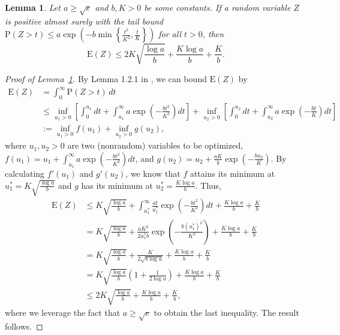 \documentclass[ejsv2,noshowframe]{imsart}
\theoremstyle{plain}
\newtheorem{lemma}[theorem]{Lemma}
\theoremstyle{definition}
\theoremstyle{remark}
\begin{document}
\vspace{3mm}

\begin{lemma}
	\label{lem:expect_bound}
	Let $a\geq \sqrt{e}$ and $b, K>0$ be some constants. If a random variable $Z$ is positive almost surely with the tail bound $\mathrm{P}(Z> t) \leq a\exp\left(-b\min\left\{\frac{t^2}{K^2}, \frac{t}{K}\right\} \right)$ for all $t>0$, then 
	$$\mathrm{E}(Z) \leq 2K \sqrt{\frac{\log a}{b}} + \frac{K\log a}{b} + \frac{K}{b}.$$
\end{lemma}

\begin{proof}[Proof of Lemma~\ref{lem:expect_bound}]
	By Lemma 1.2.1 in \cite{vershynin2018high}, we can bound $\mathrm{E}(Z)$ by
	\begin{align*}
		\mathrm{E}(Z) &= \int_0^{\infty} \mathrm{P}(Z > t) \,dt\\
		&\leq \inf_{u_1>0}\left[\int_0^{u_1} dt + \int_{u_1}^{\infty} a\exp\left(-\frac{bt^2}{K^2} \right)dt \right] + \inf_{u_2>0}\left[\int_0^{u_2} dt + \int_{u_2}^{\infty} a\exp\left(-\frac{bt}{K} \right)dt \right]\\
		&:= \inf_{u_1>0} f(u_1) + \inf_{u_2>0} g(u_2),
	\end{align*}
	where $u_1,u_2>0$ are two (nonrandom) variables to be optimized, $f(u_1) = u_1+\int_{u_1}^{\infty} a\exp\left(-\frac{bt^2}{K^2} \right)dt$, and $g(u_2)=u_2 + \frac{aK}{b} \exp\left(-\frac{bu_2}{K} \right)$. By calculating $f'(u_1)$ and $g'(u_2)$, we know that $f$ attains its minimum at $u_1^* = K\sqrt{\frac{\log a}{b}}$ and $g$ has its minimum at $u_2^*=\frac{K\log a}{b}$. Thus,
	\begin{align*}
		\mathrm{E}(Z) &\leq K\sqrt{\frac{\log a}{b}} + \int_{u_1^*}^{\infty} \frac{a t}{u_1^*}\exp\left(-\frac{bt^2}{K^2} \right)dt + \frac{K\log a}{b} + \frac{K}{b}\\
		&= K\sqrt{\frac{\log a}{b}} + \frac{aK^2}{2u_1^* b} \exp\left(-\frac{b\left(u_1^* \right)^2}{K^2} \right) + \frac{K\log a}{b} + \frac{K}{b}\\
		&= K\sqrt{\frac{\log a}{b}} + \frac{K}{2\sqrt{b\log a}} + \frac{K\log a}{b} + \frac{K}{b}\\
		&= K\sqrt{\frac{\log a}{b}} \left(1+\frac{1}{2\log a} \right) + \frac{K\log a}{b} + \frac{K}{b}\\
		&\leq 2K \sqrt{\frac{\log a}{b}} + \frac{K\log a}{b} + \frac{K}{b},
	\end{align*}
	where we leverage the fact that $a\geq \sqrt{e}$ to obtain the last inequality. The result follows.
\end{proof}
\end{document}
